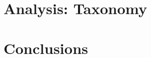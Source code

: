 \documentclass[11pt,a4paper]{article}
\begin{document}
\section{Analysis: Taxonomy}
\label{sec:taxo}



\section{Conclusions}
\label{sec:conc}




% 
\end{document}
